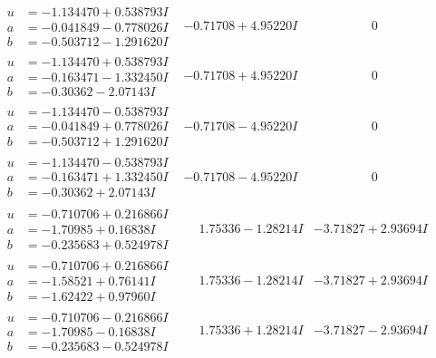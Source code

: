 \documentclass[1p]{elsarticle_modified}
\theoremstyle{definition}
\begin{document}
$$\begin{array}{c|c|c}
 \hline 
\begin{aligned}
u &= -1.134470 + 0.538793 I \\
a &= -0.041849 - 0.778026 I \\
b &= -0.503712 - 1.291620 I\end{aligned}
 & -0.71708 + 4.95220 I & \phantom{-0.000000 } 0 \\ \hline\begin{aligned}
u &= -1.134470 + 0.538793 I \\
a &= -0.163471 - 1.332450 I \\
b &= -0.30362 - 2.07143 I\end{aligned}
 & -0.71708 + 4.95220 I & \phantom{-0.000000 } 0 \\ \hline\begin{aligned}
u &= -1.134470 - 0.538793 I \\
a &= -0.041849 + 0.778026 I \\
b &= -0.503712 + 1.291620 I\end{aligned}
 & -0.71708 - 4.95220 I & \phantom{-0.000000 } 0 \\ \hline\begin{aligned}
u &= -1.134470 - 0.538793 I \\
a &= -0.163471 + 1.332450 I \\
b &= -0.30362 + 2.07143 I\end{aligned}
 & -0.71708 - 4.95220 I & \phantom{-0.000000 } 0 \\ \hline\begin{aligned}
u &= -0.710706 + 0.216866 I \\
a &= -1.70985 + 0.16838 I \\
b &= -0.235683 + 0.524978 I\end{aligned}
 & \phantom{-}1.75336 - 1.28214 I & -3.71827 + 2.93694 I \\ \hline\begin{aligned}
u &= -0.710706 + 0.216866 I \\
a &= -1.58521 + 0.76141 I \\
b &= -1.62422 + 0.97960 I\end{aligned}
 & \phantom{-}1.75336 - 1.28214 I & -3.71827 + 2.93694 I \\ \hline\begin{aligned}
u &= -0.710706 - 0.216866 I \\
a &= -1.70985 - 0.16838 I \\
b &= -0.235683 - 0.524978 I\end{aligned}
 & \phantom{-}1.75336 + 1.28214 I & -3.71827 - 2.93694 I \\ \hline\begin{aligned}

\end{aligned}
\end{array}$$
\end{document}
